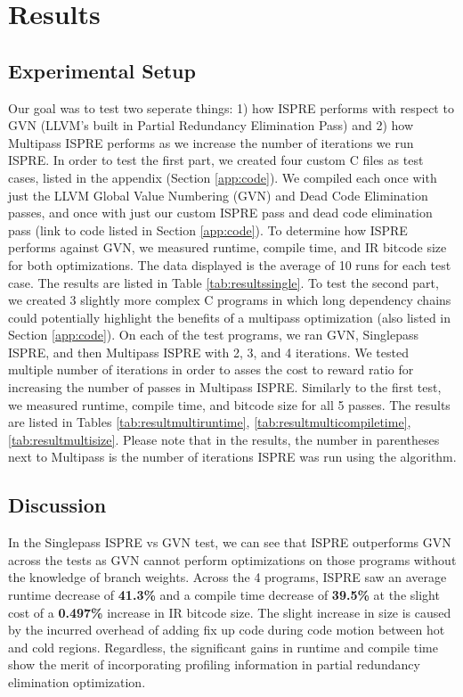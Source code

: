 \documentclass[sigplan,screen]{acmart}
\begin{document}
    \section{Results}
	\label{sec:results}

    \subsection{Experimental Setup}
    Our goal was to test two seperate things: 1) how ISPRE performs with respect to GVN (LLVM's built in Partial Redundancy Elimination Pass) and 2) how Multipass ISPRE performs as we increase the number of iterations we run ISPRE. In order to test the first part, we created four custom C files as test cases, listed in the appendix (Section \ref{app:code}). We compiled each once with just the LLVM Global Value Numbering (GVN) and Dead Code Elimination passes, and once with just our custom ISPRE pass and dead code elimination pass (link to code listed in Section \ref{app:code}). To determine how ISPRE performs against GVN, we measured runtime, compile time, and IR bitcode size for both optimizations. The data displayed is the average of 10 runs for each test case. The results are listed in Table \ref{tab:resultssingle}. To test the second part, we created 3 slightly more complex C programs in which long dependency chains could potentially highlight the benefits of a multipass optimization (also listed in Section \ref{app:code}). On each of the test programs, we ran GVN, Singlepass ISPRE, and then Multipass ISPRE with 2, 3, and 4 iterations. We tested multiple number of iterations in order to asses the cost to reward ratio for increasing the number of passes in Multipass ISPRE. Similarly to the first test, we measured runtime, compile time, and bitcode size for all 5 passes. The results are listed in Tables \ref{tab:resultmultiruntime}, \ref{tab:resultmulticompiletime}, \ref{tab:resultmultisize}. Please note that in the results, the number in parentheses next to Multipass is the number of iterations ISPRE was run using the algorithm. 

    \subsection{Discussion}

    In the Singlepass ISPRE vs GVN test, we can see that ISPRE outperforms GVN across the tests as GVN cannot perform optimizations on those programs without the knowledge of branch weights. Across the 4 programs, ISPRE saw an average runtime decrease of \textbf{41.3\%} and a compile time decrease of \textbf{39.5\%} at the slight cost of a \textbf{0.497\%} increase in IR bitcode size. The slight increase in size is caused by the incurred overhead of adding fix up code during code motion between hot and cold regions. Regardless, the significant gains in runtime and compile time show the merit of incorporating profiling information in partial redundancy elimination optimization.
\end{document}
